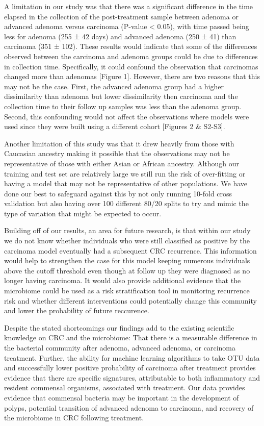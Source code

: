 \documentclass[12pt,]{article}
\begin{document}
A limitation in our study was that there was a significant difference in
the time elapsed in the collection of the post-treatment sample between
adenoma or advanced adenoma versus carcinoma (P-value \textless{} 0.05),
with time passed being less for adenoma (255 ± 42 days) and advanced
adenoma (250 ± 41) than carcinoma (351 ± 102). These results would
indicate that some of the differences observed between the carcinoma and
adenoma groups could be due to differences in collection time.
Specifically, it could confound the observation that carcinomas changed
more than adenomas {[}Figure 1{]}. However, there are two reasons that
this may not be the case. First, the advanced adenoma group had a higher
dissimilarity than adenoma but lower dissimilarity then carcinoma and
the collection time to their follow up samples was less than the adenoma
group. Second, this confounding would not affect the observations where
models were used since they were built using a different cohort
{[}Figures 2 \& S2-S3{]}.

Another limitation of this study was that it drew heavily from those
with Caucasian ancestry making it possible that the observations may not
be representative of those with either Asian or African ancestry.
Although our training and test set are relatively large we still run the
risk of over-fitting or having a model that may not be representative of
other populations. We have done our best to safeguard against this by
not only running 10-fold cross validation but also having over 100
different 80/20 splits to try and mimic the type of variation that might
be expected to occur.

Building off of our results, an area for future research, is that within
our study we do not know whether individuals who were still classified
as positive by the carcinoma model eventually had a subsequent CRC
recurrence. This information would help to strengthen the case for this
model keeping numerous individuals above the cutoff threshold even
though at follow up they were diagnosed as no longer having carcinoma.
It would also provide additional evidence that the microbiome could be
used as a risk stratification tool in monitoring recurrence risk and
whether different interventions could potentially change this community
and lower the probability of future reccurence.

Despite the stated shortcomings our findings add to the existing
scientific knowledge on CRC and the microbiome: That there is a
measurable difference in the bacterial community after adenoma, advanced
adenoma, or carcinoma treatment. Further, the ability for machine
learning algorithms to take OTU data and successfully lower positive
probability of carcinoma after treatment provides evidence that there
are specific signatures, attributable to both inflammatory and resident
commensal organisms, associated with treatment. Our data provides
evidence that commensal bacteria may be important in the development of
polyps, potential transition of advanced adenoma to carcinoma, and
recovery of the microbiome in CRC following treatment.
\end{document}
